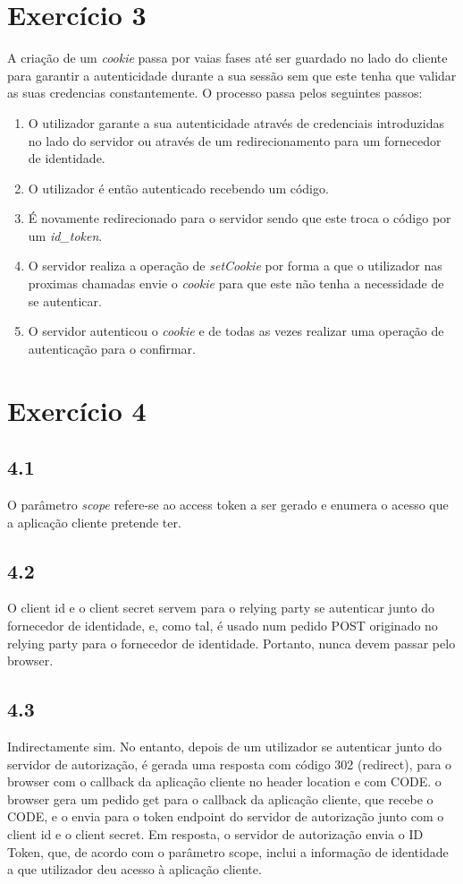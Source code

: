 \documentclass[11pt]{report}
\begin{document}
\section{Exercício 3}
	A criação de um \textit{cookie} passa por vaias fases até ser guardado no lado do cliente para garantir a autenticidade durante a sua sessão sem que este tenha que validar as suas credencias constantemente.
	O processo passa pelos seguintes passos:
	\begin{enumerate}
		\item O utilizador garante a sua autenticidade através de credenciais introduzidas no lado do servidor ou através de um redirecionamento para um fornecedor de identidade.
		\item O utilizador é então autenticado recebendo um código. 
		\item É novamente redirecionado para o servidor sendo que este troca o código por um \textit{id\_token}.
		\item O servidor realiza a operação de \textit{setCookie} por forma a que o utilizador nas proximas chamadas envie o \textit{cookie} para que este não tenha a necessidade de se autenticar.
		\item O servidor autenticou o \textit{cookie} e de todas as vezes realizar uma operação de autenticação para o confirmar.
	\end{enumerate}

\section{Exercício 4}
	\subsection*{4.1}
	O parâmetro \textit{scope} refere-se ao access token a ser gerado e enumera o acesso que a aplicação cliente pretende ter.
	\subsection*{4.2}
	O client id e o client secret servem para o relying party se autenticar junto do fornecedor de identidade, e, como tal, é usado num pedido POST originado no relying party para o fornecedor de identidade. Portanto, nunca devem passar pelo browser.
	
	\subsection*{4.3}
	Indirectamente sim. No entanto, depois de um utilizador se autenticar junto do servidor de autorização, é gerada uma resposta com código 302 (redirect), para o browser com o callback da aplicação cliente no header location e com CODE. o browser gera um pedido get para o callback da aplicação cliente, que recebe o CODE, e o envia para o token endpoint do servidor de autorização junto com o client id e o client secret. Em resposta, o servidor de autorização envia o ID Token, que, de acordo com o parâmetro scope, inclui a informação de identidade a que utilizador deu acesso à aplicação cliente.
\end{document}
